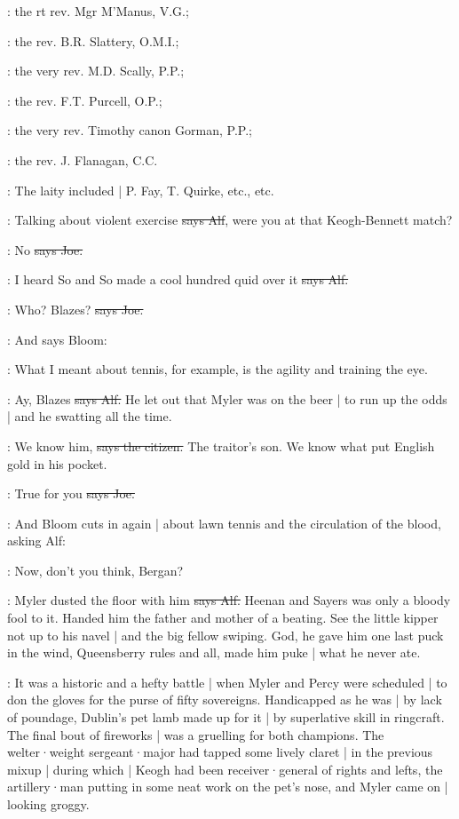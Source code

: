 :
the rt rev. Mgr M'Manus, V.G.;

:
the rev. B.R. Slattery, O.M.I.;

:
the very rev. M.D. Scally, P.P.;

:
the rev. F.T. Purcell, O.P.;

:
the very rev. Timothy canon Gorman, P.P.;

:
the rev. J. Flanagan, C.C.

:
The laity included |
P. Fay,
T. Quirke,
etc.,
etc.

\bergan:
Talking about violent exercise
\sout{says Alf},
were you at that Keogh-Bennett match?

\joe:
No
\sout{says Joe.}

\bergan:
I heard So and So made a cool hundred quid over it
\sout{says Alf.}

\joe:
Who?
Blazes?
\sout{says Joe.}

\Nq:
And says Bloom:

\Bloom:
What I meant about tennis,
for example,
is the agility and training the eye.

\bergan:
Ay,
Blazes
\sout{says Alf.}
He let out that Myler was on the beer |
to run up the odds |
and he swatting all the time.

\citizen:
We know him,
\sout{says the citizen.}
The traitor's son.
We know what put English gold in his pocket.

\joe:
True for you
\sout{says Joe.}

\Nq:
And Bloom cuts in again |
about lawn tennis and the circulation of the blood,
asking Alf:

\Bloom:
Now,
don't you think,
Bergan?

\bergan:
Myler dusted the floor with him
\sout{says Alf.}
Heenan and Sayers was only a bloody fool to it.
Handed him the father and mother of a beating.
See the little kipper not up to his navel |
and the big fellow swiping.
God,
he gave him one last puck in the wind,
Queensberry rules and all,
made him puke |
what he never ate.

:
It was a historic and a hefty battle |
when Myler and Percy were scheduled |
to don the gloves for the purse of fifty sovereigns.
Handicapped as he was |
by lack of poundage,
Dublin's pet lamb made up for it |
by superlative skill in ringcraft.
The final bout of fireworks |
was a gruelling for both champions.
The welter·weight sergeant·major had tapped some lively claret |
in the previous mixup |
during which |
Keogh had been receiver·general of rights and lefts,
the artillery·man putting in some neat work on the pet's nose,
and Myler came on |
looking groggy.

